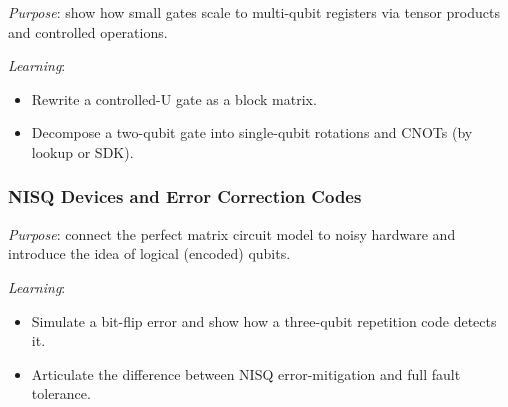 \emph{Purpose}: show how small gates scale to multi-qubit registers via tensor products and controlled operations.

\emph{Learning}:
\begin{itemize}
	\item Rewrite a controlled-U gate as a block matrix.
	\item Decompose a two-qubit gate into single-qubit rotations and CNOTs (by lookup or SDK).
\end{itemize}



\subsubsection{NISQ Devices and Error Correction Codes}

\emph{Purpose}: connect the perfect matrix circuit model to noisy hardware and introduce the idea of logical (encoded) qubits.

\emph{Learning}:
\begin{itemize}
	\item Simulate a bit-flip error and show how a three-qubit repetition code detects it.
	\item Articulate the difference between NISQ error-mitigation and full fault tolerance.
\end{itemize}



